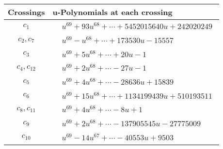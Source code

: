 \documentclass[1p]{elsarticle_modified}
\theoremstyle{definition}
\begin{document}
\begin{tabular}{m{50pt}|m{274pt}}
Crossings & \hspace{64pt}u-Polynomials at each crossing \\
\hline $$\begin{aligned}c_{1}\end{aligned}$$&$\begin{aligned}
&u^{69}+93 u^{68}+\cdots+5452015640 u+242020249
\end{aligned}$\\
\hline $$\begin{aligned}c_{2},c_{7}\end{aligned}$$&$\begin{aligned}
&u^{69}- u^{68}+\cdots+173530 u-15557
\end{aligned}$\\
\hline $$\begin{aligned}c_{3}\end{aligned}$$&$\begin{aligned}
&u^{69}+5 u^{68}+\cdots+20 u-1
\end{aligned}$\\
\hline $$\begin{aligned}c_{4},c_{12}\end{aligned}$$&$\begin{aligned}
&u^{69}+2 u^{68}+\cdots-27 u-1
\end{aligned}$\\
\hline $$\begin{aligned}c_{5}\end{aligned}$$&$\begin{aligned}
&u^{69}+4 u^{68}+\cdots-28636 u+15839
\end{aligned}$\\
\hline $$\begin{aligned}c_{6}\end{aligned}$$&$\begin{aligned}
&u^{69}+15 u^{68}+\cdots+1134199439 u+510193511
\end{aligned}$\\
\hline $$\begin{aligned}c_{8},c_{11}\end{aligned}$$&$\begin{aligned}
&u^{69}+4 u^{68}+\cdots-8 u+1
\end{aligned}$\\
\hline $$\begin{aligned}c_{9}\end{aligned}$$&$\begin{aligned}
&u^{69}+2 u^{68}+\cdots-137905545 u-27775009
\end{aligned}$\\
\hline $$\begin{aligned}c_{10}\end{aligned}$$&$\begin{aligned}
&u^{69}-14 u^{67}+\cdots-40553 u+9503
\end{aligned}$\\
\hline
\end{tabular}\\~\\
\end{document}
